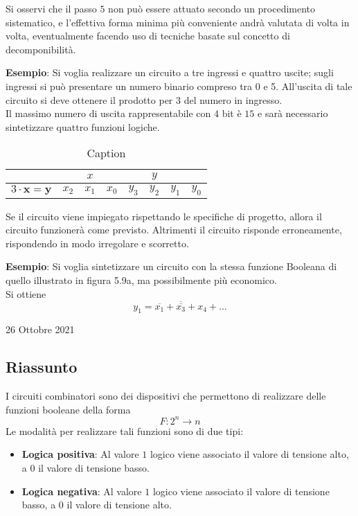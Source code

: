 \documentclass[a4paper]{extarticle}
\begin{document}
Si osservi che il passo \(5\) non può essere attuato secondo un procedimento sistematico, e l’effettiva forma minima più conveniente andrà valutata di volta in volta, eventualmente facendo uso di tecniche basate sul concetto di decomponibilità.

\vspace{1em}
\noindent
\textbf{Esempio}: Si voglia realizzare un circuito a tre ingressi e quattro uscite; sugli ingressi si può presentare un numero binario compreso tra 0 e 5. All’uscita di tale circuito si deve ottenere il prodotto per \(3\) del numero in ingresso.\\
Il massimo numero di uscita rappresentabile con \(4\) bit è \(15\) e sarà necessario sintetizzare quattro funzioni logiche.

\begin{table}[H]
    \centering
    \setlength{\tabcolsep}{8pt}
    \begin{tabular}{l||ccc|cccc}
         & & \textbf{\(x\)} & & & \textbf{\(y\)} &\\
         \hline
         \(3 \cdot \textbf{x} = \textbf{y}\) & \(x_2\) & \(x_1\) & \(x_0\) & \(y_3\) & \(y_2\) & \(y_1\) & \(y_0\)\\
         \hline
    \end{tabular}
    \caption{Caption}
    \label{tab:my_label}
\end{table}

\vspace{1em}
\noindent
Se il circuito viene impiegato rispettando le specifiche di progetto, allora il circuito funzionerà come previsto. Altrimenti il circuito risponde erroneamente, rispondendo in modo irregolare e scorretto.

\vspace{2em}
\noindent
\textbf{Esempio}: Si voglia sintetizzare un circuito con la stessa funzione Booleana di quello illustrato in figura 5.9a,
ma possibilmente più economico.\\
Si ottiene
\[y_1 = \overline{\overline{x_1} + \overline{x_3} + x_4} + ... \]

\newpage
\begin{center}
    26 Ottobre 2021
\end{center}

\subsection{Riassunto}
I circuiti combinatori sono dei dispositivi che permettono di realizzare delle funzioni booleane della forma
\[F : 2^n \rightarrow n\]
Le modalità per realizzare tali funzioni sono di due tipi:
\begin{itemize}
    \item \textbf{Logica positiva}: Al valore \(1\) logico viene associato il valore di tensione alto, a \(0\) il valore di tensione basso.

    \item \textbf{Logica negativa}: Al valore \(1\) logico viene associato il valore di tensione basso, a \(0\) il valore di tensione alto.
\end{itemize}
\end{document}
